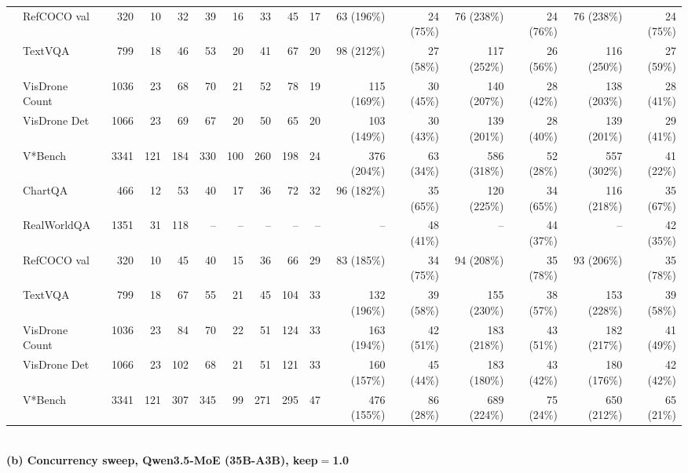 \begin{table}[t]
\begin{center}
\begin{small}
\begin{sc}
{\begin{tabular}{llrrrrrrrrrrrrrr}
& RefCOCO val & 320 & 10 & 32 & 39 & 16 & 33 & 45 & 17 & 63 (196\%) & 24 (75\%) & 76 (238\%) & 24 (76\%) & 76 (238\%) & 24 (75\%) \\
& TextVQA & 799 & 18 & 46 & 53 & 20 & 41 & 67 & 20 & 98 (212\%) & 27 (58\%) & 117 (252\%) & 26 (56\%) & 116 (250\%) & 27 (59\%) \\
& VisDrone Count & 1036 & 23 & 68 & 70 & 21 & 52 & 78 & 19 & 115 (169\%) & 30 (45\%) & 140 (207\%) & 28 (42\%) & 138 (203\%) & 28 (41\%) \\
& VisDrone Det & 1066 & 23 & 69 & 67 & 20 & 50 & 65 & 20 & 103 (149\%) & 30 (43\%) & 139 (201\%) & 28 (40\%) & 139 (201\%) & 29 (41\%) \\
& V*Bench & 3341 & 121 & 184 & 330 & 100 & 260 & 198 & 24 & 376 (204\%) & 63 (34\%) & 586 (318\%) & 52 (28\%) & 557 (302\%) & 41 (22\%) \\
\midrule
{}
& ChartQA & 466 & 12 & 53 & 40 & 17 & 36 & 72 & 32 & 96 (182\%) & 35 (65\%) & 120 (225\%) & 34 (65\%) & 116 (218\%) & 35 (67\%) \\
& RealWorldQA & 1351 & 31 & 118 & -- & -- & -- & -- & -- & -- & 48 (41\%) & -- & 44 (37\%) & -- & 42 (35\%) \\
& RefCOCO val & 320 & 10 & 45 & 40 & 15 & 36 & 66 & 29 & 83 (185\%) & 34 (75\%) & 94 (208\%) & 35 (78\%) & 93 (206\%) & 35 (78\%) \\
& TextVQA & 799 & 18 & 67 & 55 & 21 & 45 & 104 & 33 & 132 (196\%) & 39 (58\%) & 155 (230\%) & 38 (57\%) & 153 (228\%) & 39 (58\%) \\
& VisDrone Count & 1036 & 23 & 84 & 70 & 22 & 51 & 124 & 33 & 163 (194\%) & 42 (51\%) & 183 (218\%) & 43 (51\%) & 182 (217\%) & 41 (49\%) \\
& VisDrone Det & 1066 & 23 & 102 & 68 & 21 & 51 & 121 & 33 & 160 (157\%) & 45 (44\%) & 183 (180\%) & 43 (42\%) & 180 (176\%) & 42 (42\%) \\
& V*Bench & 3341 & 121 & 307 & 345 & 99 & 271 & 295 & 47 & 476 (155\%) & 86 (28\%) & 689 (224\%) & 75 (24\%) & 650 (212\%) & 65 (21\%) \\
\bottomrule
\end{tabular}}
\\[6pt]
\textbf{(b) Concurrency sweep, Qwen3.5-MoE (35B-A3B), keep$=$1.0}\\[2pt]
\end{sc}
\end{small}
\end{center}
\end{table}

